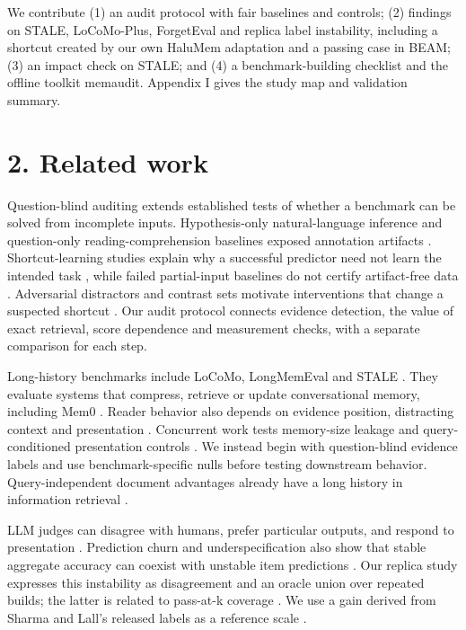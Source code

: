 \documentclass[11pt]{article}
\begin{document}
We contribute (1) an audit protocol with fair baselines and controls; (2) findings on STALE, LoCoMo-Plus, ForgetEval and replica label instability, including a shortcut created by our own HaluMem adaptation and a passing case in BEAM; (3) an impact check on STALE; and (4) a benchmark-building checklist and the offline toolkit memaudit. Appendix I gives the study map and validation summary.

\label{main-2}

\section{2. Related work}\label{related-work}

Question-blind auditing extends established tests of whether a benchmark can be solved from incomplete inputs. Hypothesis-only natural-language inference and question-only reading-comprehension baselines exposed annotation artifacts \citep{Gururangan2018AnnotationArtifacts, Poliak2018HypothesisOnly, KaushikLipton2018ReadingComprehension}. Shortcut-learning studies explain why a successful predictor need not learn the intended task \citep{Geirhos2020ShortcutLearning}, while failed partial-input baselines do not certify artifact-free data \citep{Feng2019Misleading}. Adversarial distractors and contrast sets motivate interventions that change a suspected shortcut \citep{JiangBansal2019Shortcuts, Gardner2020ContrastSets}. Our audit protocol connects evidence detection, the value of exact retrieval, score dependence and measurement checks, with a separate comparison for each step.

Long-history benchmarks include LoCoMo, LongMemEval and STALE \citep{Maharana2024LoCoMo, Wu2025LongMemEval, Chao2026STALE}. They evaluate systems that compress, retrieve or update conversational memory, including Mem0 \citep{Chhikara2025Mem0}. Read\-er behavior also depends on evidence position, distracting context and presentation \citep{Liu2024LostMiddle, Shi2023Distracted, Sclar2024Spurious}. Concurrent work tests memory-size leakage and query-conditioned presentation controls \citep{Mondal2026BeforeAnswering, Jiang2026Presentation, Si2026Render}. We instead begin with question-blind evidence labels and use benchmark-specific nulls before testing downstream behavior. Query-independent document advantages already have a long history in information retrieval \citep{Singhal1996Pivoted, Kraaij2002Priors}.

LLM judges can disagree with humans, prefer particular outputs, and respond to presentation \citep{Zheng2023MTBench, Thakur2024JudgingJudges, Panickssery2024SelfPreference}. Prediction churn and underspecification also show that stable aggregate accuracy can coexist with unstable item predictions \citep{MilaniFard2016Churn, DAmour2022Underspecification}. Our replica study expresses this instability as disagreement and an oracle union over repeated builds; the latter is related to pass-at-k coverage \citep{Chen2021PassAtK}. We use a gain derived from Sharma and Lall's released labels as a reference scale \citep{SharmaLall2026Selection}.
\end{document}
